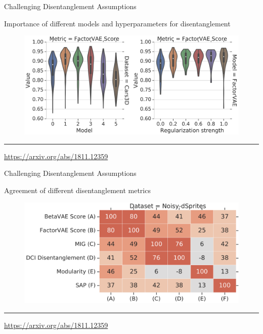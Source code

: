 \documentclass{beamer}
\begin{document}
\begin{frame}{Challenging Disentanglement Assumptions}
	\begin{block}{Importance of different models and hyperparameters for disentanglement}
		\begin{figure}
			\centering
			\includegraphics[width=\linewidth]{figs/challenge_dis_2}
		\end{figure}
	\end{block}
	\vfill
	\hrule\medskip
	{\scriptsize \href{https://arxiv.org/abs/1811.12359}{https://arxiv.org/abs/1811.12359}}
\end{frame}
\begin{frame}{Challenging Disentanglement Assumptions}
	\begin{block}{Agreement of different disentanglement metrics}
		\begin{figure}
			\centering
			\includegraphics[width=0.9\linewidth]{figs/challenge_dis_3}
		\end{figure}
		\vspace{0.5cm}
	\end{block}
	\vfill
	\hrule\medskip
	{\scriptsize \href{https://arxiv.org/abs/1811.12359}{https://arxiv.org/abs/1811.12359}}
\end{frame}
\end{document}
